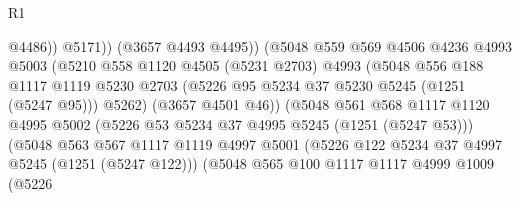 \begin{lexlean}{R1}
\begin{coremodule}
                                                @4486))
                                            @5171))
                                        (@3657 @4493 @4495))
                                      (@5048
                                        @559
                                        @569
                                        @4506
                                        @4236
                                        @4993
                                        @5003
                                        (@5210
                                          @558
                                          @1120
                                          @4505
                                          (@5231 @2703)
                                          @4993
                                          (@5048
                                            @556
                                            @188
                                            @1117
                                            @1119
                                            @5230
                                            @2703
                                            (@5226 @95 @5234 @37 @5230 @5245 (@1251 (@5247 @95)))
                                            @5262)
                                          (@3657 @4501 @46))
                                        (@5048
                                          @561
                                          @568
                                          @1117
                                          @1120
                                          @4995
                                          @5002
                                          (@5226 @53 @5234 @37 @4995 @5245 (@1251 (@5247 @53)))
                                          (@5048
                                            @563
                                            @567
                                            @1117
                                            @1119
                                            @4997
                                            @5001
                                            (@5226 @122 @5234 @37 @4997 @5245 (@1251 (@5247 @122)))
                                            (@5048
                                              @565
                                              @100
                                              @1117
                                              @1117
                                              @4999
                                              @1009
                                              (@5226

\end{coremodule}
\end{lexlean}
